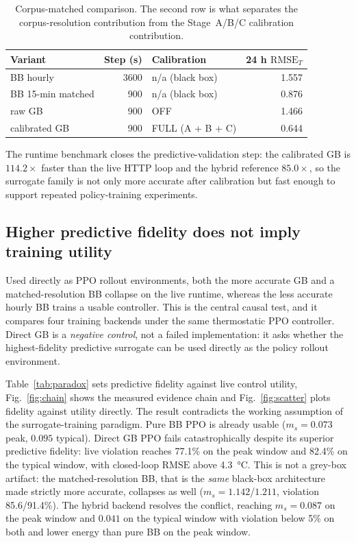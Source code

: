 \documentclass[energies,article,submit,moreauthors]{Definitions/mdpi}
\newcommand{\RMSE}{\ensuremath{\mathrm{RMSE}}}
\newcommand{\ms}{\ensuremath{m_s}}
\begin{document}
\begin{table}[H]
\centering
\small
\caption{Corpus-matched comparison. The second row is what separates the corpus-resolution
contribution from the Stage~A/B/C calibration contribution.}
\label{tab:matched}
\begin{tabular}{@{}lrlr@{}}
\toprule
Variant & Step (s) & Calibration & 24 h $\RMSE_T$ \\
\midrule
BB hourly & 3600 & n/a (black box) & 1.557 \\
BB 15-min matched & 900 & n/a (black box) & 0.876 \\
raw GB & 900 & OFF & 1.466 \\
calibrated GB & 900 & FULL (A + B + C) & 0.644 \\
\bottomrule
\end{tabular}
\end{table}

The runtime benchmark closes the predictive-validation step: the calibrated GB is $114.2\times$
faster than the live HTTP loop and the hybrid reference $85.0\times$, so the surrogate family is not
only more accurate after calibration but fast enough to support repeated policy-training
experiments.

\subsection{Higher predictive fidelity does not imply training utility}\label{sec:paradox}

Used directly as PPO rollout environments, both the more accurate GB and a matched-resolution BB
collapse on the live runtime, whereas the less accurate hourly BB trains a usable controller. This
is the central causal test, and it compares four training backends under the same thermostatic PPO
controller. Direct GB is a \emph{negative control}, not a failed implementation: it asks whether the
highest-fidelity predictive surrogate can be used directly as the policy rollout environment.

Table~\ref{tab:paradox} sets predictive fidelity against live control utility, Fig.~\ref{fig:chain}
shows the measured evidence chain and Fig.~\ref{fig:scatter} plots fidelity against utility
directly. The result contradicts the working assumption of the surrogate-training paradigm. Pure BB
PPO is already usable ($\ms=0.073$ peak, $0.095$ typical). Direct GB PPO fails catastrophically
despite its superior predictive fidelity: live violation reaches 77.1\% on the peak window and
82.4\% on the typical window, with closed-loop \RMSE{} above \SI{4.3}{\celsius}. This is not a
grey-box artifact: the matched-resolution BB, that is the \emph{same} black-box architecture made
strictly more accurate, collapses as well ($\ms=1.142$/$1.211$, violation 85.6/91.4\%). The hybrid
backend resolves the conflict, reaching $\ms=0.087$ on the peak window and $0.041$ on the typical
window with violation below 5\% on both and lower energy than pure BB on the peak window.
\end{document}
